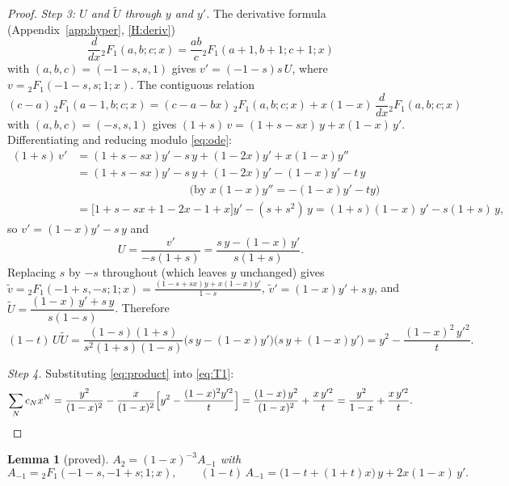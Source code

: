 \documentclass[11pt]{article}
\newtheorem{lemma}[theorem]{Lemma}
\theoremstyle{definition}
\theoremstyle{remark}
\newcommand{\F}[4]{{}_2F_1\!\left(#1,#2;#3;#4\right)}
\begin{document}
\begin{proof}
\emph{Step 3: $U$ and $\tilde U$ through $y$ and $y'$.} The derivative formula (Appendix~\ref{app:hyper}, \ref{H:deriv})
\[
\frac{d}{dx}\F abcx=\frac{ab}c\F{a+1}{b+1}{c+1}x
\]
with $(a,b,c)=(-1-s,s,1)$ gives $v'=(-1-s)s\,U$, where $v=\F{-1-s}{s}{1}{x}$. The contiguous relation
\begin{equation}\label{eq:contig}
(c-a)\,\F{a-1}bcx=(c-a-bx)\,\F abcx+x(1-x)\,\frac{d}{dx}\F abcx
\end{equation}
with $(a,b,c)=(-s,s,1)$ gives $(1+s)\,v=(1+s-sx)\,y+x(1-x)\,y'$. Differentiating and reducing modulo \eqref{eq:ode}:
\begin{align*}
(1+s)\,v'&=(1+s-sx)y'-s\,y+(1-2x)y'+x(1-x)y''\\
&=(1+s-sx)y'-s\,y+(1-2x)y'-(1-x)y'-t\,y\\
&\hspace{10em}\bigl(\text{by }x(1-x)y''=-(1-x)y'-ty\bigr)\\
&=\bigl[1+s-sx+1-2x-1+x\bigr]y'-(s+s^2)\,y=(1+s)(1-x)\,y'-s(1+s)\,y ,
\end{align*}
so $v'=(1-x)y'-s\,y$ and
\[
U=\frac{v'}{-s(1+s)}=\frac{s\,y-(1-x)\,y'}{s(1+s)}.
\]
Replacing $s$ by $-s$ throughout (which leaves $y$ unchanged) gives $\tilde v=\F{-1+s}{-s}1x=\frac{(1-s+sx)y+x(1-x)y'}{1-s}$, $\tilde v'=(1-x)y'+s\,y$, and $\tilde U=\dfrac{(1-x)\,y'+s\,y}{s(1-s)}$. Therefore
\begin{equation}\label{eq:product}
(1-t)\,U\tilde U=\frac{(1-s)(1+s)}{s^2(1+s)(1-s)}\bigl(s\,y-(1-x)y'\bigr)\bigl(s\,y+(1-x)y'\bigr)=y^2-\frac{(1-x)^2\,y'^2}{t}.
\end{equation}

\emph{Step 4.} Substituting \eqref{eq:product} into \eqref{eq:T1}:
\[
\sum_Nc_Nx^N=\frac{y^2}{(1-x)^2}-\frac{x}{(1-x)^2}\Bigl[y^2-\frac{(1-x)^2y'^2}{t}\Bigr]
=\frac{(1-x)\,y^2}{(1-x)^2}+\frac{x\,y'^2}{t}=\frac{y^2}{1-x}+\frac{x\,y'^2}{t}.\qedhere
\]
\end{proof}

\begin{lemma}[proved]\label{lem:A2}
$A_2=(1-x)^{-3}A_{-1}$ with
\[
A_{-1}=\F{-1-s}{-1+s}{1}{x},\qquad (1-t)\,A_{-1}=\bigl(1-t+(1+t)x\bigr)\,y+2x(1-x)\,y'.
\]
\end{lemma}
\end{document}
